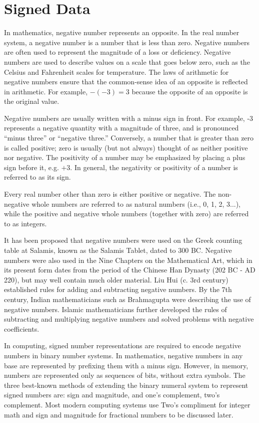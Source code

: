 \documentclass[letterpaper, 12pt]{book}
\begin{document}
\chapter{Signed Data}

In mathematics, negative number represents an opposite. In the real number system, a negative number is a number that is 
less than zero. Negative numbers are often used to represent the magnitude of a loss or deficiency. Negative 
numbers are used to describe values on a scale that goes below zero, such as the Celsius and Fahrenheit scales for 
temperature. The laws of arithmetic for negative numbers ensure that the common-sense idea of an opposite is reflected 
in arithmetic. For example, $-(-3) = 3$ because the opposite of an opposite is the original value.

Negative numbers are usually written with a minus sign in front. For example, -3 represents a negative quantity with a 
magnitude of three, and is pronounced ``minus three'' or ``negative three.'' Conversely, a number that is greater than 
zero is called positive; zero is usually (but not always) thought of as neither positive nor negative. The positivity 
of a number may be emphasized by placing a plus sign before it, e.g. $+3$. In general, the negativity or positivity of 
a number is referred to as its sign.

Every real number other than zero is either positive or negative. The non-negative whole numbers are referred to as 
natural numbers (i.e., 0, 1, 2, 3...), while the positive and negative whole numbers (together with zero) are 
referred to as integers. 

It has been proposed that negative numbers were used on the Greek counting table at Salamis, known as the Salamis Tablet, 
dated to 300 BC. Negative numbers were also used in the Nine Chapters on the Mathematical Art, which in its present form 
dates from the period of the Chinese Han Dynasty (202 BC - AD 220), but may well contain much older material. Liu Hui 
(c. 3rd century) established rules for adding and subtracting negative numbers. By the 7th century, Indian mathematicians 
such as Brahmagupta were describing the use of negative numbers. Islamic mathematicians further developed the rules of 
subtracting and multiplying negative numbers and solved problems with negative coefficients. 

In computing, signed number representations are required to encode negative numbers in binary number systems. In 
mathematics, negative numbers in any base are represented by prefixing them with a minus sign. However, in memory, 
numbers are represented only as sequences of bits, without extra symbols. The three best-known methods of extending the 
binary numeral system to represent signed numbers are: sign and magnitude, and one's complement, two's complement. Most 
modern computing systems use Two's compliment for integer math and sign and magnitude for fractional numbers to be 
discussed later. 
\end{document}
